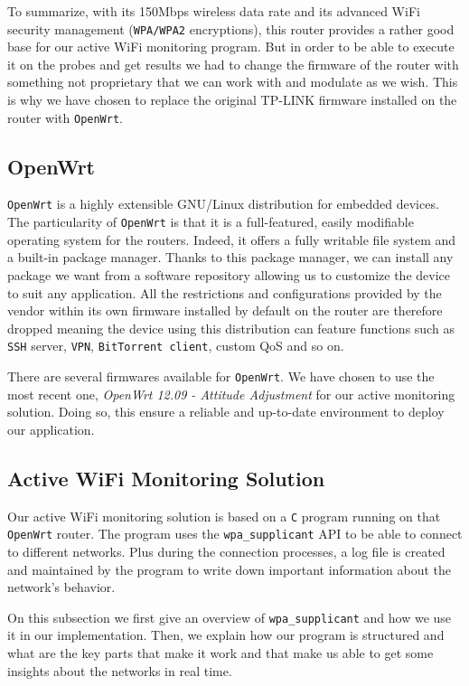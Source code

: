 To summarize, with its 150Mbps wireless data rate and its advanced WiFi security management (\texttt{WPA/WPA2} encryptions), this router provides a rather good base for our active WiFi monitoring program. But in order to be able to execute it on the probes and get results we had to change the firmware of the router with something not proprietary that we can work with and modulate as we wish. This is why we have chosen to replace the original TP-LINK firmware installed on the router with \texttt{OpenWrt}.


\subsection{OpenWrt}
\texttt{OpenWrt}\cite{openwrt} is a highly extensible GNU/Linux distribution for embedded devices. The particularity of \texttt{OpenWrt} is that it is a full-featured, easily modifiable operating system for the routers. Indeed, it offers a fully writable file system and a built-in package manager. Thanks to this package manager, we can install any package we want from a software repository allowing us to customize the device to suit any application. All the restrictions and configurations provided by the vendor within its own firmware installed by default on the router are therefore dropped meaning the device using this distribution can feature functions such as \texttt{SSH} server, \texttt{VPN}, \texttt{BitTorrent client}, custom QoS and so on.

There are several firmwares available for \texttt{OpenWrt}. We have chosen to use the most recent one, \textit{OpenWrt 12.09 - Attitude Adjustment} for our active monitoring solution. Doing so, this ensure a reliable and up-to-date environment to deploy our application.


\subsection{Active WiFi Monitoring Solution}
Our active WiFi monitoring solution is based on a \texttt{C} program running on that \texttt{OpenWrt} router. The program uses the \texttt{wpa\_supplicant} API to be able to connect to different networks. Plus during the connection processes, a log file is created and maintained by the program to write down important information about the network's behavior. 

On this subsection we first give an overview of \texttt{wpa\_supplicant} and how we use it in our implementation. Then, we explain how our program is structured and what are the key parts that make it work and that make us able to get some insights about the networks in real time.

